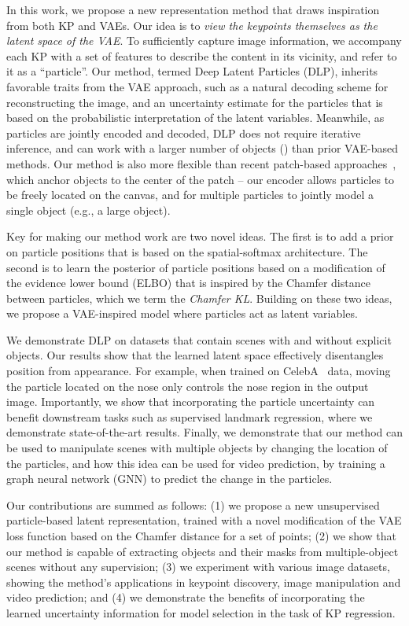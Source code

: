 \documentclass[nohyperref]{article}
\theoremstyle{plain}
\theoremstyle{definition}
\theoremstyle{remark}
\begin{document}
In this work, we propose a new representation method that draws inspiration from both KP and VAEs. Our idea is to \textit{view the keypoints themselves as the latent space of the VAE}. To sufficiently capture image information, we accompany each KP with a set of features to describe the content in its vicinity, and refer to it as a ``particle''. Our method, termed Deep Latent Particles (DLP), inherits favorable traits from the VAE approach, such as a natural decoding scheme for reconstructing the image, and an uncertainty estimate for the particles that is based on the probabilistic interpretation of the latent variables. Meanwhile, 
as particles are jointly encoded and decoded, DLP does not require iterative inference, and can work with a larger number of objects () than prior VAE-based methods. Our method is also more flexible than recent patch-based approaches~\citep{smirnov2021marionette, lin2020space}, which anchor objects to the center of the patch -- our encoder allows particles to be freely located on the canvas, and for multiple particles to jointly model a single object (e.g., a large object).

Key for making our method work are two novel ideas. The first is to add a prior on particle positions that is based on the spatial-softmax architecture. The second is to learn the posterior of particle positions based on a modification of the evidence lower bound (ELBO) that is inspired by the Chamfer distance between particles, which we term the \textit{Chamfer KL}. Building on these two ideas, we propose a VAE-inspired model where particles act as latent variables.


We demonstrate DLP on datasets that contain scenes with and without explicit objects. Our results show that the learned latent space effectively disentangles position from appearance. For example, when trained on CelebA~\citep{liu2015faceattributes} data, moving the particle located on the nose only controls the nose region in the output image.
Importantly, we show that incorporating the particle uncertainty can benefit downstream tasks such as supervised landmark regression, where we demonstrate state-of-the-art results. Finally, we demonstrate that our method can be used to manipulate scenes with multiple objects by changing the location of the particles, and how this idea can be used for video prediction, by training a graph neural network (GNN) to predict the change in the particles.


Our contributions are summed as follows: (1) we propose a new unsupervised particle-based latent representation, trained with a novel modification of the VAE loss function based on the Chamfer distance for a set of points; (2) we show that our method is capable of extracting objects and their masks from multiple-object scenes without any supervision; (3) we experiment with various image datasets, showing the method's applications in keypoint discovery, image manipulation and video prediction; and (4) we demonstrate the benefits of incorporating the learned uncertainty information for model selection in the task of KP regression.
\end{document}
